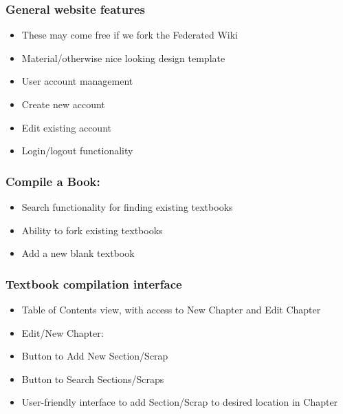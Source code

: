 \documentclass[letterpaper, 10pt, draftclsnofoot, onecolumn]{IEEEtran}
\begin{document}
{{{

\subsubsection[System feature 1: General Website Features]{\rmfamily\bfseries\color{black} General website features
}
\begin{itemize}
\item These may come free if we fork the Federated Wiki
\item Material/otherwise nice looking design template
\item User account management
\item Create new account
\item Edit existing account
\item Login/logout functionality
\end{itemize}

\subsubsection[System feature 2: Compile a book]{\rmfamily\bfseries\color{black} Compile a Book:
}
\begin{itemize}
\item Search functionality for finding existing textbooks
\item Ability to fork existing textbooks
\item Add a new blank textbook
\end{itemize}

\subsubsection[System feature 3: Textbook Compilation Interface]{\rmfamily\bfseries\color{black} Textbook compilation interface
}
\begin{itemize}
\item Table of Contents view, with access to New Chapter and Edit Chapter
\item Edit/New Chapter:
\item Button to Add New Section/Scrap
\item Button to Search Sections/Scraps
\item User-friendly interface to add Section/Scrap to desired location in Chapter
\end{itemize}

}}}
\end{document}
